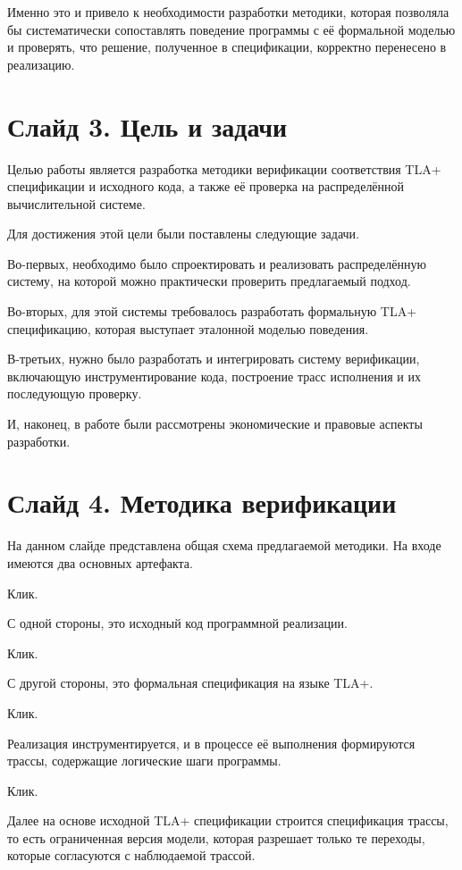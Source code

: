 \documentclass[12pt,a4paper]{article}
\begin{document}
Именно это и привело к необходимости разработки методики, которая
позволяла бы систематически сопоставлять поведение программы с её
формальной моделью и проверять, что решение, полученное в спецификации,
корректно перенесено в реализацию.

\section*{Слайд 3. Цель и задачи}

Целью работы является разработка методики верификации соответствия
TLA+ спецификации и исходного кода, а также её проверка на
распределённой вычислительной системе.

Для достижения этой цели были поставлены следующие задачи.

Во-первых, необходимо было спроектировать и реализовать
распределённую систему, на которой можно практически проверить
предлагаемый подход.

Во-вторых, для этой системы требовалось разработать формальную
TLA+ спецификацию, которая выступает эталонной моделью поведения.

В-третьих, нужно было разработать и интегрировать систему
верификации, включающую инструментирование кода, построение трасс
исполнения и их последующую проверку.

И, наконец, в работе были рассмотрены экономические и правовые
аспекты разработки.

\section*{Слайд 4. Методика верификации}

На данном слайде представлена общая схема предлагаемой методики.
На входе имеются два основных артефакта.

Клик.

С одной стороны, это исходный код программной реализации.

Клик.

С другой стороны, это формальная спецификация на языке TLA+.

Клик.

Реализация инструментируется, и в процессе её выполнения формируются
трассы, содержащие логические шаги программы.

Клик.

Далее на основе исходной TLA+ спецификации строится спецификация
трассы, то есть ограниченная версия модели, которая разрешает только
те переходы, которые согласуются с наблюдаемой трассой.
\end{document}
